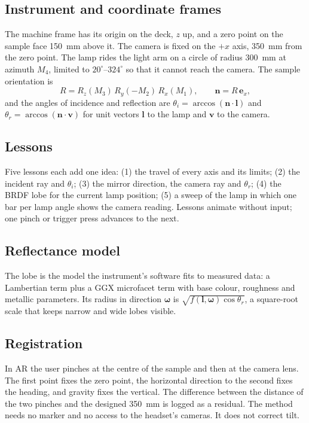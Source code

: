 \documentclass[11pt]{article}
\begin{document}
\subsection{Instrument and coordinate frames}
The machine frame has its origin on the deck, $z$ up, and a zero point on the sample face 150~mm above it. The camera
is fixed on the $+x$ axis, 350~mm from the zero point. The lamp rides the light arm on a circle of radius 300~mm at
azimuth $M_4$, limited to $20^\circ$--$324^\circ$ so that it cannot reach the camera. The sample orientation is
\begin{equation}
R = R_z(M_3)\,R_y(-M_2)\,R_x(M_1), \qquad \mathbf{n} = R\,\mathbf{e}_x ,
\end{equation}
and the angles of incidence and reflection are $\theta_i = \arccos(\mathbf{n}\cdot\mathbf{l})$ and
$\theta_r = \arccos(\mathbf{n}\cdot\mathbf{v})$ for unit vectors $\mathbf{l}$ to the lamp and $\mathbf{v}$ to the camera.

\subsection{Lessons}
Five lessons each add one idea: (1) the travel of every axis and its limits; (2) the incident ray and $\theta_i$;
(3) the mirror direction, the camera ray and $\theta_r$; (4) the BRDF lobe for the current lamp position; (5) a sweep
of the lamp in which one bar per lamp angle shows the camera reading. Lessons animate without input; one pinch or
trigger press advances to the next.

\subsection{Reflectance model}
The lobe is the model the instrument's software fits to measured data: a Lambertian term plus a GGX microfacet term
\parencite{R6} with base colour, roughness and metallic parameters. Its radius in direction $\boldsymbol\omega$ is
$\sqrt{f(\mathbf{l},\boldsymbol\omega)\cos\theta_r}$, a square-root scale that keeps narrow and wide lobes visible.

\subsection{Registration}
In AR the user pinches at the centre of the sample and then at the camera lens. The first point fixes the zero point,
the horizontal direction to the second fixes the heading, and gravity fixes the vertical. The difference between the
distance of the two pinches and the designed 350~mm is logged as a residual. The method needs no marker and no access
to the headset's cameras. It does not correct tilt.
\end{document}
